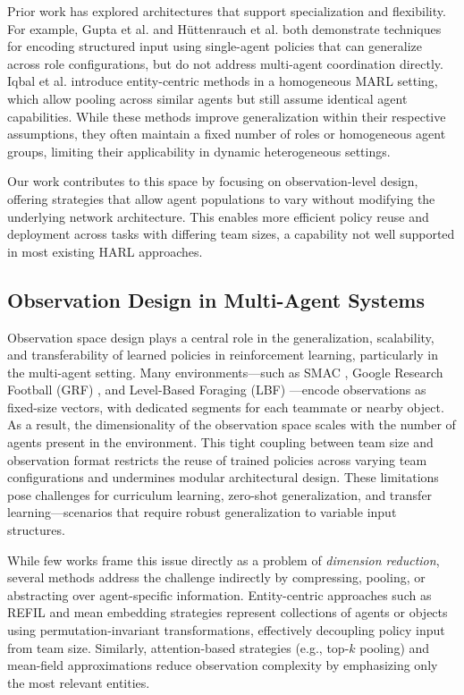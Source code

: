 \documentclass{article}
\begin{document}
Prior work has explored architectures that support specialization and flexibility. 
For example, Gupta et al. \cite{gupta2017a} and H{\"u}ttenrauch et al. \cite{huttenrauch2019} 
both demonstrate techniques for encoding structured input using single-agent policies that 
can generalize across role configurations, but do not address multi-agent coordination directly. 
Iqbal et al. \cite{iqbal2021} introduce entity-centric methods in a homogeneous MARL setting, 
which allow pooling across similar agents but still assume identical agent capabilities. 
While these methods improve generalization within their respective assumptions, they often 
maintain a fixed number of roles or homogeneous agent groups, limiting their applicability 
in dynamic heterogeneous settings.

Our work contributes to this space by focusing on observation-level design, offering strategies
that allow agent populations to vary without modifying the underlying network architecture.
This enables more efficient policy reuse and deployment across tasks with differing team sizes,
a capability not well supported in most existing HARL approaches.

\subsection{Observation Design in Multi-Agent Systems}
\label{sec:related_work-observation_design}

Observation space design plays a central role in the generalization, scalability, 
and transferability of learned policies in reinforcement learning, 
particularly in the multi-agent setting. 
Many environments—such as SMAC \cite{samvelyan2019}, 
Google Research Football (GRF) \cite{kurach2020}, 
and Level-Based Foraging (LBF) \cite{papoudakis2021}—encode observations as fixed-size vectors, 
with dedicated segments for each teammate or nearby object. 
As a result, the dimensionality of the observation space scales with the 
number of agents present in the environment. 
This tight coupling between team size and observation format restricts the 
reuse of trained policies across varying team configurations and undermines 
modular architectural design. These limitations pose challenges for curriculum learning, 
zero-shot generalization, and transfer learning—scenarios that require robust generalization 
to variable input structures.


While few works frame this issue directly as a problem of \textit{dimension reduction}, 
several methods address the challenge indirectly by compressing, pooling, 
or abstracting over agent-specific information. 
Entity-centric approaches such as REFIL \cite{iqbal2021} and mean embedding strategies 
\cite{huttenrauch2019} represent collections of agents or objects using permutation-invariant 
transformations, effectively decoupling policy input from team size. 
Similarly, attention-based strategies (e.g., top-$k$ pooling) and mean-field approximations 
\cite{yang2021a} reduce observation complexity by emphasizing only the most relevant entities.
\end{document}
